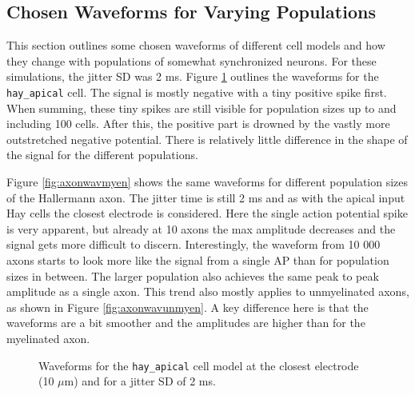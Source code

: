 \documentclass[final, a4paper,masters,en,listoffigures,listoftables,norwegiandates]{NMBU}
\begin{document}
\subsection{Chosen Waveforms for Varying Populations}\label{subsec:waveforms}
This section outlines some chosen waveforms of different cell models and how they change with populations of somewhat synchronized neurons. For these simulations, the jitter SD was 2 ms. Figure \ref{fig:apicalwav} outlines the waveforms for the \texttt{hay\_apical} cell. The signal is mostly negative with a tiny positive spike first. When summing, these tiny spikes are still visible for population sizes up to and including 100 cells. After this, the positive part is drowned by the vastly more outstretched negative potential. There is relatively little difference in the shape of the signal for the different populations.

Figure \ref{fig:axonwavmyen} shows the same waveforms for different population sizes of the Hallermann axon. The jitter time is still 2 ms and as with the apical input Hay cells the closest electrode is considered. Here the single action potential spike is very apparent, but already at 10 axons the max amplitude decreases and the signal gets more difficult to discern. Interestingly, the waveform from 10 000 axons starts to look more like the signal from a single AP than for population sizes in between. The larger population also achieves the same peak to peak amplitude as a single axon. This trend also mostly applies to unmyelinated axons, as shown in Figure \ref{fig:axonwavunmyen}. A key difference here is that the waveforms are a bit smoother and the amplitudes are higher than for the myelinated axon. 

\begin{figure}[htbp]
    \centering
    \caption{Waveforms for the \texttt{hay\_apical} cell model at the closest electrode (10 $\mu$m) and for a jitter SD of 2 ms.}
    \label{fig:apicalwav}
\end{figure}
\end{document}
